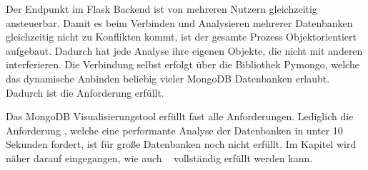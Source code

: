 Der Endpunkt im Flask Backend ist von mehreren Nutzern gleichzeitig ansteuerbar.
Damit es beim Verbinden und Analysieren mehrerer Datenbanken gleichzeitig nicht zu Konflikten kommt, ist der gesamte Prozess Objektorientiert aufgebaut.
Dadurch hat jede Analyse ihre eigenen Objekte, die nicht mit anderen interferieren.
Die Verbindung selbst erfolgt über die Bibliothek Pymongo, welche das dynamische Anbinden beliebig vieler MongoDB Datenbanken erlaubt.
Dadurch ist die Anforderung  erfüllt.

Das MongoDB Visualisierungstool erfüllt fast alle Anforderungen.
Lediglich die Anforderung , welche eine performante Analyse der Datenbanken in unter 10 Sekunden fordert, ist für große Datenbanken noch nicht erfüllt.
Im Kapitel  wird näher darauf eingegangen, wie auch ~ vollständig erfüllt werden kann.
